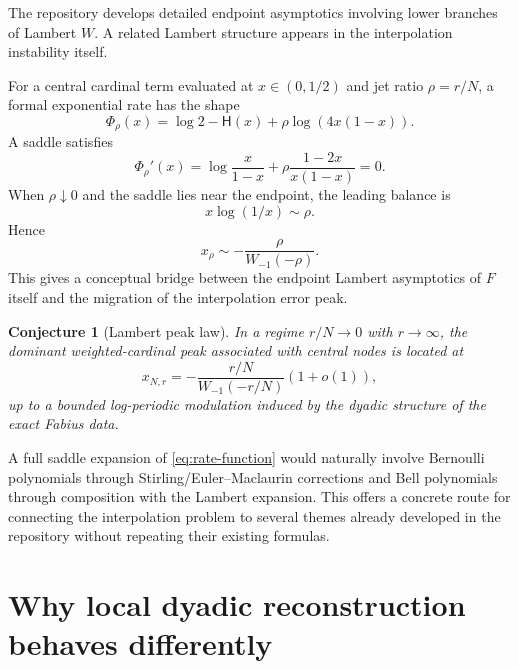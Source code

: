 \documentclass[11pt,oneside]{article}
\newtheorem{conjecture}[theorem]{Conjecture}
\theoremstyle{definition}
\theoremstyle{remark}
\begin{document}
The repository develops detailed endpoint asymptotics involving lower branches of Lambert $W$.  A related Lambert structure appears in the interpolation instability itself.

For a central cardinal term evaluated at $x\in(0,1/2)$ and jet ratio $\rho=r/N$, a formal exponential rate has the shape
\begin{equation}
 \Phi_\rho(x)=\log2-\mathsf H(x)+\rho\log(4x(1-x)).
 \label{eq:rate-function}
\end{equation}
A saddle satisfies
\begin{equation}
 \Phi_\rho'(x)=
 \log\frac{x}{1-x}+\rho\frac{1-2x}{x(1-x)}=0.
 \label{eq:saddle-equation}
\end{equation}
When $\rho\downarrow0$ and the saddle lies near the endpoint, the leading balance is
\begin{equation}
 x\log(1/x)\sim\rho.
\end{equation}
Hence
\begin{equation}
 x_\rho\sim -\frac{\rho}{W_{-1}(-\rho)}.
 \label{eq:lambert-peak}
\end{equation}
This gives a conceptual bridge between the endpoint Lambert asymptotics of $F$ itself and the migration of the interpolation error peak.

\begin{conjecture}[Lambert peak law]
\label{conj:lambert-peak}
In a regime $r/N\to0$ with $r\to\infty$, the dominant weighted-cardinal peak associated with central nodes is located at
\begin{equation}
 x_{N,r}= -\frac{r/N}{W_{-1}(-r/N)}\left(1+o(1)\right),
 \end{equation}
up to a bounded log-periodic modulation induced by the dyadic structure of the exact Fabius data.
\end{conjecture}

A full saddle expansion of \eqref{eq:rate-function} would naturally involve Bernoulli polynomials through Stirling/Euler--Maclaurin corrections and Bell polynomials through composition with the Lambert expansion.  This offers a concrete route for connecting the interpolation problem to several themes already developed in the repository without repeating their existing formulas.

\section{Why local dyadic reconstruction behaves differently}
\label{sec:local-global}
\end{document}
